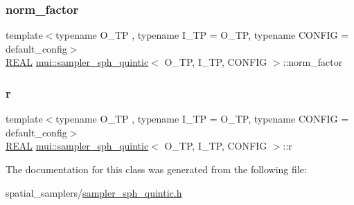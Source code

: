 \subsubsection{\texorpdfstring{norm\+\_\+factor}{norm\_factor}}
{\footnotesize\ttfamily template$<$typename O\+\_\+\+TP , typename I\+\_\+\+TP  = O\+\_\+\+TP, typename C\+O\+N\+F\+IG  = default\+\_\+config$>$ \\
\hyperlink{classmui_1_1sampler__sph__quintic_ab47a0d5297b716d51c2ab6857f586103}{R\+E\+AL} \hyperlink{classmui_1_1sampler__sph__quintic}{mui\+::sampler\+\_\+sph\+\_\+quintic}$<$ O\+\_\+\+TP, I\+\_\+\+TP, C\+O\+N\+F\+IG $>$\+::norm\+\_\+factor\hspace{0.3cm}{\ttfamily [protected]}}

\mbox{\label{classmui_1_1sampler__sph__quintic_a7b9f8e91cc8b7460c1e1b9057da72131}} 
\subsubsection{\texorpdfstring{r}{r}}
{\footnotesize\ttfamily template$<$typename O\+\_\+\+TP , typename I\+\_\+\+TP  = O\+\_\+\+TP, typename C\+O\+N\+F\+IG  = default\+\_\+config$>$ \\
\hyperlink{classmui_1_1sampler__sph__quintic_ab47a0d5297b716d51c2ab6857f586103}{R\+E\+AL} \hyperlink{classmui_1_1sampler__sph__quintic}{mui\+::sampler\+\_\+sph\+\_\+quintic}$<$ O\+\_\+\+TP, I\+\_\+\+TP, C\+O\+N\+F\+IG $>$\+::r\hspace{0.3cm}{\ttfamily [protected]}}



The documentation for this class was generated from the following file\+:\begin{DoxyCompactItemize}
\item 
spatial\+\_\+samplers/\hyperlink{sampler__sph__quintic_8h}{sampler\+\_\+sph\+\_\+quintic.\+h}\end{DoxyCompactItemize}
